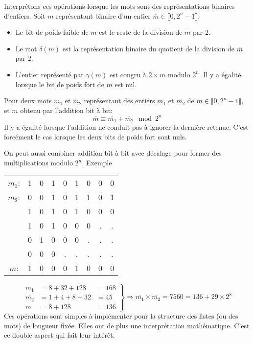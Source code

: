 \begin{enumerate}
Interprétons ces opérations lorsque les mots sont des représentations binaires d'entiers. Soit $m$ représentant binaire d'un entier $\overline{m}\in \llbracket 0, 2^{n}-1 \rrbracket$:
\begin{itemize}
  \item Le bit de poids faible de $m$ est le reste de la division de $\overline{m}$ par $2$.
  \item Le mot $\delta(m)$ est la représentation binaire du quotient de la division de $\overline{m}$ par $2$.
  \item L'entier représenté par $\gamma(m)$ est congru à $2\times\overline{m}$ modulo $2^{n}$. Il y a égalité lorsque le bit de poids fort de $m$ est nul.
\end{itemize}
Pour deux mots $m_1$ et $m_2$ représentant des entiers $\overline{m}_1$ et $\overline{m}_2$ de $\overline{m}\in \llbracket 0, 2^{n}-1 \rrbracket$, et $m$ obtenu par l'addition bit à bit:
\begin{displaymath}
  \overline{m} \equiv \overline{m_1} + \overline{m_2} \mod 2^{n}
\end{displaymath}
Il y a égalité lorsque l'addition ne conduit pas à ignorer la dernière retenue. C'est forcément le cas lorsque les deux bits de poids fort sont nuls. 
\end{enumerate}
On peut aussi combiner addition bit à bit avec décalage pour former des multiplications modulo $2^n$.
Exemple
  \begin{center}
  \begin{tabular}{ccccccccc}
    $m_1$: & 1 & 0 & 1 & 0 & 1 & 0 & 0 & 0 \\
    $m_2$: & 0 & 0 & 1 & 0 & 1 & 1 & 0 & 1 \\ \hline 
           & 1 & 0 & 1 & 0 & 1 & 0 & 0 & 0 \\
           & 1 & 0 & 1 & 0 & 0 & 0 & . & .  \\
           & 0 & 1 & 0 & 0 & 0 & . & . & . \\
           & 0 & 0 & 0 & . & . & . & . & . \\ \hline
    $m$:   & 1 & 0 & 0 & 0 & 1 & 0 & 0 & 0
  \end{tabular}    
  \end{center}
  
\begin{displaymath}
\left. 
\begin{aligned}
\overline{m_1} &= 8 + 32 + 128 &= 168 \\
\overline{m_2} &= 1 + 4 + 8 + 32 &= 45 \\
\overline{m} &=  8 + 128 &= 136
\end{aligned}
\right\rbrace \Rightarrow
\overline{m_1}\times \overline{m_2} = 7560 =136 + 29\times 2^8 
\end{displaymath}
Ces opérations sont simples à implémenter pour la structure des listes (ou des mots) de longueur fixée. Elles ont de plus une interprétation mathématique. C'est ce double aspect qui fait leur intérêt.



